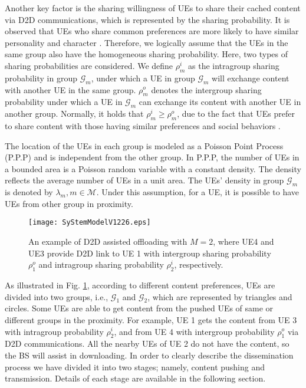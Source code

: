 \documentclass[12pt, draftclsnofoot, onecolumn]{IEEEtran}
\begin{document}
Another key factor is the sharing willingness of UEs to share their cached content via D2D communications, which is represented by the sharing probability.
It is observed that UEs who share common preferences are more likely to have similar personality and character \cite{lewis2012social}.
Therefore, we logically assume that the UEs in the same group also have the homogeneous sharing probability.
Here, two types of sharing probabilities are considered. We define $\rho_m^i$ as the intragroup sharing probability in group $\mathcal{G}_m$, under which a UE in group $\mathcal{G}_m$ will exchange content with another UE in the same group. $\rho_m^o$ denotes the intergroup sharing probability under which a UE in $\mathcal{G}_m$ can exchange its content with another UE in another group. Normally, it holds that $\rho_m^i \geq \rho_m^o$, due to the fact that UEs prefer to share content with those having similar preferences and social behaviors \cite{li2011impact}.

The location of the UEs in each group is modeled as a Poisson Point Process (P.P.P) \cite{chiu2013stochastic} and is independent from the other group. In P.P.P, the number of UEs in a bounded area is a Poisson random variable with a constant density. The density reflects the average number of UEs in a unit area.
 The UEs' density in group $\mathcal{G}_m$ is denoted by $\lambda_m, m \in \mathcal{M}$. Under this assumption, for a UE, it is possible to have UEs from other group in proximity.

\begin{figure}
\center
\texttt{[image: SyStemModelV1226.eps]}
\caption{ An example of D2D assisted offloading with $M=2$, where UE4 and UE3 provide D2D link to UE 1 with intergroup sharing probability $\rho_1^o$ and intragroup sharing probability $\rho_2^i$, respectively.}
\label{blo}
\end{figure}
As illustrated in Fig. \ref{blo}, according to different content preferences, UEs are divided into two groups, i.e., $\mathcal{G}_1$ and $\mathcal{G}_2$, which are represented by triangles and circles. Some UEs are able to get content from the pushed UEs of same or different groups in the proximity. For example, UE 1 gets the content from UE 3 with intragroup probability $\rho_2^i$, and from UE 4 with intergroup probability $\rho_1^o$ via D2D communications. All the nearby UEs of UE 2 do not have the content, so the BS will assist in downloading. In order to clearly describe the dissemination process we have divided it into two stages; namely, content pushing and transmission. Details of each stage are available in the following section.
\end{document}

